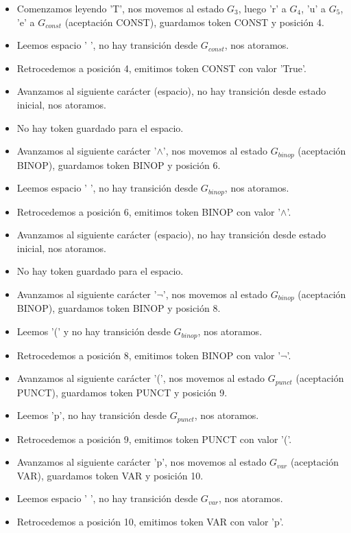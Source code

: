 \begin{enumerate}
    \begin{itemize}
        \item Comenzamos leyendo 'T', nos movemos al estado $G_{3}$, luego 'r' a $G_{4}$, 'u' a $G_{5}$, 'e' a $G_{const}$ (aceptación CONST), guardamos token CONST y posición 4.
        \item Leemos espacio ' ', no hay transición desde $G_{const}$, nos atoramos.
        \item Retrocedemos a posición 4, emitimos token CONST con valor 'True'.
        \item Avanzamos al siguiente carácter (espacio), no hay transición desde estado inicial, nos atoramos.
        \item No hay token guardado para el espacio.
        \item Avanzamos al siguiente carácter '$\land$', nos movemos al estado $G_{binop}$ (aceptación BINOP), guardamos token BINOP y posición 6.
        \item Leemos espacio ' ', no hay transición desde $G_{binop}$, nos atoramos.
        \item Retrocedemos a posición 6, emitimos token BINOP con valor '$\land$'.
        \item Avanzamos al siguiente carácter (espacio), no hay transición desde estado inicial, nos atoramos.
        \item No hay token guardado para el espacio.
        \item Avanzamos al siguiente carácter '$\lnot$', nos movemos al estado $G_{binop}$ (aceptación BINOP), guardamos token BINOP y posición 8.
        \item Leemos '(' y no hay transición desde $G_{binop}$, nos atoramos.
        \item Retrocedemos a posición 8, emitimos token BINOP con valor '$\lnot$'.
        \item Avanzamos al siguiente carácter '(', nos movemos al estado $G_{punct}$ (aceptación PUNCT), guardamos token PUNCT y posición 9.
        \item Leemos 'p', no hay transición desde $G_{punct}$, nos atoramos.
        \item Retrocedemos a posición 9, emitimos token PUNCT con valor '('.
        \item Avanzamos al siguiente carácter 'p', nos movemos al estado $G_{var}$ (aceptación VAR), guardamos token VAR y posición 10.
        \item Leemos espacio ' ', no hay transición desde $G_{var}$, nos atoramos.
        \item Retrocedemos a posición 10, emitimos token VAR con valor 'p'.

\end{itemize}
\end{enumerate}
